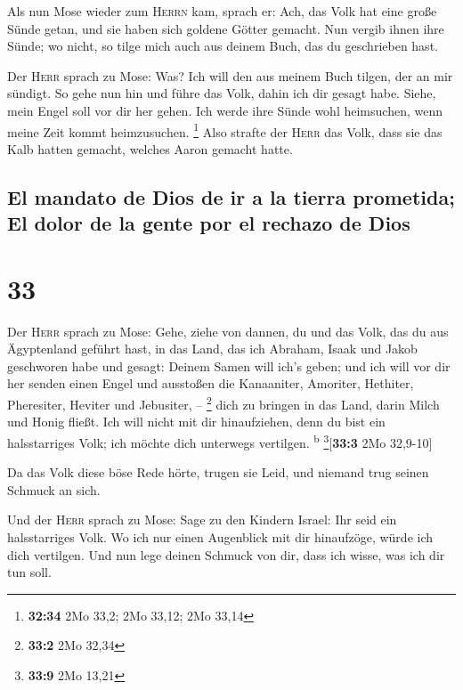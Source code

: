  Als nun Mose wieder zum \textsc{Herrn} kam, sprach er:
Ach, das Volk hat eine große Sünde getan, und sie haben sich goldene
Götter gemacht.  Nun vergib ihnen ihre Sünde; wo nicht,
so tilge mich auch aus deinem Buch, das du geschrieben hast.

 Der \textsc{Herr} sprach zu Mose: Was? Ich will den aus
meinem Buch tilgen, der an mir sündigt.  So gehe nun hin
und führe das Volk, dahin ich dir gesagt habe. Siehe, mein Engel soll
vor dir her gehen. Ich werde ihre Sünde wohl heimsuchen, wenn meine Zeit
kommt heimzusuchen. \footnote{\textbf{32:34} 2Mo 33,2; 2Mo 33,12; 2Mo
  33,14}  Also strafte der \textsc{Herr} das Volk, dass
sie das Kalb hatten gemacht, welches Aaron gemacht hatte.

\hypertarget{el-mandato-de-dios-de-ir-a-la-tierra-prometida-el-dolor-de-la-gente-por-el-rechazo-de-dios}{%
\subsection{El mandato de Dios de ir a la tierra prometida; El dolor de
la gente por el rechazo de
Dios}\label{el-mandato-de-dios-de-ir-a-la-tierra-prometida-el-dolor-de-la-gente-por-el-rechazo-de-dios}}

\hypertarget{section-32}{%
\section{33}\label{section-32}}

 Der \textsc{Herr} sprach zu Mose: Gehe, ziehe von dannen,
du und das Volk, das du aus Ägyptenland geführt hast, in das Land, das
ich Abraham, Isaak und Jakob geschworen habe und gesagt: Deinem Samen
will ich's geben;  und ich will vor dir her senden einen
Engel und ausstoßen die Kanaaniter, Amoriter, Hethiter, Pheresiter,
Heviter und Jebusiter, -- \footnote{\textbf{33:2} 2Mo 32,34}
 dich zu bringen in das Land, darin Milch und Honig
fließt. Ich will nicht mit dir hinaufziehen, denn du bist ein
halsstarriges Volk; ich möchte dich unterwegs vertilgen.
\textsuperscript{b} \footnote{\textbf{33:9} 2Mo 13,21}{[}\textbf{33:3}
2Mo 32,9-10{]}

 Da das Volk diese böse Rede hörte, trugen sie Leid, und
niemand trug seinen Schmuck an sich.

 Und der \textsc{Herr} sprach zu Mose: Sage zu den Kindern
Israel: Ihr seid ein halsstarriges Volk. Wo ich nur einen Augenblick mit
dir hinaufzöge, würde ich dich vertilgen. Und nun lege deinen Schmuck
von dir, dass ich wisse, was ich dir tun soll.

